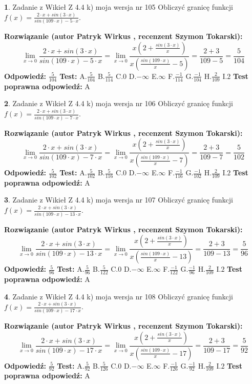 \documentclass[12pt, a4paper]{article}
\theoremstyle{definition} %
\newtheorem{zad}{}
\newcommand{\zadStart}[1]{\begin{zad}#1\newline}
\newcommand{\zadStop}{\end{zad}}
\newcommand{\rozwStart}[2]{\noindent \textbf{Rozwiązanie (autor #1 , recenzent #2): }\newline}
\newcommand{\rozwStop}{\newline}
\newcommand{\odpStart}{\noindent \textbf{Odpowiedź:}\newline}
\newcommand{\odpStop}{\newline}
\newcommand{\testStart}{\noindent \textbf{Test:}\newline}
\newcommand{\testStop}{\newline}
\newcommand{\kluczStart}{\noindent \textbf{Test poprawna odpowiedź:}\newline}
\newcommand{\kluczStop}{\newline}
\begin{document}
\zadStart{Zadanie z Wikieł Z 4.4 k) moja wersja nr 105}
Obliczyć granicę funkcji $f(x)=\frac{2\cdot x +sin(3\cdot x)}{sin(109\cdot x) -5\cdot x}$.
\zadStop
\rozwStart{Patryk Wirkus}{Szymon Tokarski}
$$\lim\limits_{x\to 0}\frac{2\cdot x +sin(3\cdot x)}{sin(109\cdot x) -5\cdot x}
=\lim\limits_{x\to 0}\frac{x(2+\frac{sin(3\cdot x)}{x})}{x(\frac{sin(109\cdot x)}{x}-5)}
=\frac{2+3}{109-5} = \frac{5}{104}$$
\rozwStop
\odpStart
$\frac{5}{104}$
\odpStop
\testStart
A.$\frac{5}{104}$
B.$\frac{5}{114}$
C.$0$
D.$-\infty$
E.$\infty$
F.$\frac{-1}{114}$
G.$\frac{-1}{104}$
H.$\frac{2}{109}$
I.$2$
\testStop
\kluczStart
A
\kluczStop



\zadStart{Zadanie z Wikieł Z 4.4 k) moja wersja nr 106}
Obliczyć granicę funkcji $f(x)=\frac{2\cdot x +sin(3\cdot x)}{sin(109\cdot x) -7\cdot x}$.
\zadStop
\rozwStart{Patryk Wirkus}{Szymon Tokarski}
$$\lim\limits_{x\to 0}\frac{2\cdot x +sin(3\cdot x)}{sin(109\cdot x) -7\cdot x}
=\lim\limits_{x\to 0}\frac{x(2+\frac{sin(3\cdot x)}{x})}{x(\frac{sin(109\cdot x)}{x}-7)}
=\frac{2+3}{109-7} = \frac{5}{102}$$
\rozwStop
\odpStart
$\frac{5}{102}$
\odpStop
\testStart
A.$\frac{5}{102}$
B.$\frac{5}{116}$
C.$0$
D.$-\infty$
E.$\infty$
F.$\frac{-1}{116}$
G.$\frac{-1}{102}$
H.$\frac{2}{109}$
I.$2$
\testStop
\kluczStart
A
\kluczStop



\zadStart{Zadanie z Wikieł Z 4.4 k) moja wersja nr 107}
Obliczyć granicę funkcji $f(x)=\frac{2\cdot x +sin(3\cdot x)}{sin(109\cdot x) -13\cdot x}$.
\zadStop
\rozwStart{Patryk Wirkus}{Szymon Tokarski}
$$\lim\limits_{x\to 0}\frac{2\cdot x +sin(3\cdot x)}{sin(109\cdot x) -13\cdot x}
=\lim\limits_{x\to 0}\frac{x(2+\frac{sin(3\cdot x)}{x})}{x(\frac{sin(109\cdot x)}{x}-13)}
=\frac{2+3}{109-13} = \frac{5}{96}$$
\rozwStop
\odpStart
$\frac{5}{96}$
\odpStop
\testStart
A.$\frac{5}{96}$
B.$\frac{5}{122}$
C.$0$
D.$-\infty$
E.$\infty$
F.$\frac{-1}{122}$
G.$\frac{-1}{96}$
H.$\frac{2}{109}$
I.$2$
\testStop
\kluczStart
A
\kluczStop



\zadStart{Zadanie z Wikieł Z 4.4 k) moja wersja nr 108}
Obliczyć granicę funkcji $f(x)=\frac{2\cdot x +sin(3\cdot x)}{sin(109\cdot x) -17\cdot x}$.
\zadStop
\rozwStart{Patryk Wirkus}{Szymon Tokarski}
$$\lim\limits_{x\to 0}\frac{2\cdot x +sin(3\cdot x)}{sin(109\cdot x) -17\cdot x}
=\lim\limits_{x\to 0}\frac{x(2+\frac{sin(3\cdot x)}{x})}{x(\frac{sin(109\cdot x)}{x}-17)}
=\frac{2+3}{109-17} = \frac{5}{92}$$
\rozwStop
\odpStart
$\frac{5}{92}$
\odpStop
\testStart
A.$\frac{5}{92}$
B.$\frac{5}{126}$
C.$0$
D.$-\infty$
E.$\infty$
F.$\frac{-1}{126}$
G.$\frac{-1}{92}$
H.$\frac{2}{109}$
I.$2$
\testStop
\kluczStart
A
\kluczStop
\end{document}
